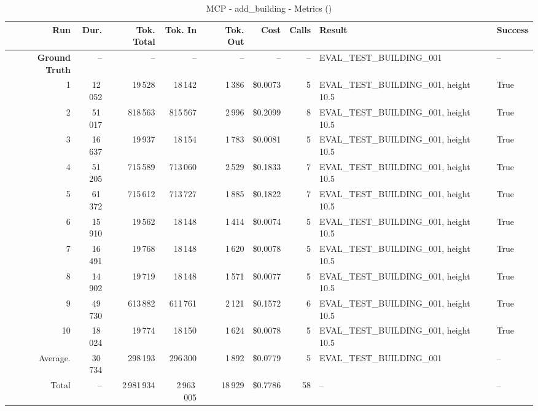 \documentclass[a4paper,11pt]{article}
\begin{document}
\begin{table}[ht]
\centering
\scriptsize
\caption{MCP - add\_building - Metrics ()}
\label{tab:mcp\_add\_building\_metrics\_}
\begin{tabular}{r r r r r r r p{3cm} l}
\hline
Run & Dur. & Tok. Total & Tok. In & Tok. Out & Cost & Calls & Result & Success \\
\hline
\textbf{Ground Truth} & -- & -- & -- & -- & -- & -- & EVAL\_TEST\_BUILDING\_001 & -- \\
\hline
1 & 12\,052 & 19\,528 & 18\,142 & 1\,386 & \$0.0073 & 5 & EVAL\_TEST\_BUILDING\_001, height 10.5 & True \\
2 & 51\,017 & 818\,563 & 815\,567 & 2\,996 & \$0.2099 & 8 & EVAL\_TEST\_BUILDING\_001, height 10.5 & True \\
3 & 16\,637 & 19\,937 & 18\,154 & 1\,783 & \$0.0081 & 5 & EVAL\_TEST\_BUILDING\_001, height 10.5 & True \\
4 & 51\,205 & 715\,589 & 713\,060 & 2\,529 & \$0.1833 & 7 & EVAL\_TEST\_BUILDING\_001, height 10.5 & True \\
5 & 61\,372 & 715\,612 & 713\,727 & 1\,885 & \$0.1822 & 7 & EVAL\_TEST\_BUILDING\_001, height 10.5 & True \\
6 & 15\,910 & 19\,562 & 18\,148 & 1\,414 & \$0.0074 & 5 & EVAL\_TEST\_BUILDING\_001, height 10.5 & True \\
7 & 16\,491 & 19\,768 & 18\,148 & 1\,620 & \$0.0078 & 5 & EVAL\_TEST\_BUILDING\_001, height 10.5 & True \\
8 & 14\,902 & 19\,719 & 18\,148 & 1\,571 & \$0.0077 & 5 & EVAL\_TEST\_BUILDING\_001, height 10.5 & True \\
9 & 49\,730 & 613\,882 & 611\,761 & 2\,121 & \$0.1572 & 6 & EVAL\_TEST\_BUILDING\_001, height 10.5 & True \\
10 & 18\,024 & 19\,774 & 18\,150 & 1\,624 & \$0.0078 & 5 & EVAL\_TEST\_BUILDING\_001, height 10.5 & True \\
\hline
Average. & 30\,734 & 298\,193 & 296\,300 & 1\,892 & \$0.0779 & 5 & EVAL\_TEST\_BUILDING\_001 & -- \\
Total & -- & 2\,981\,934 & 2\,963\,005 & 18\,929 & \$0.7786 & 58 & -- & -- \\
\hline
\end{tabular}
\end{table}

\clearpage
\end{document}
